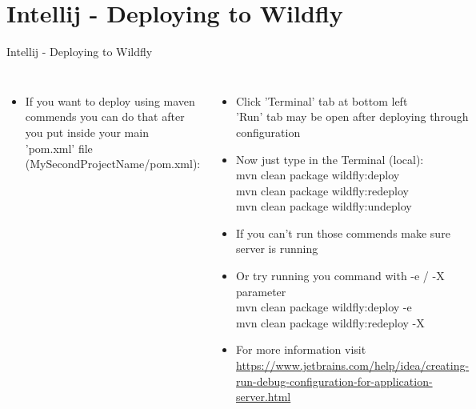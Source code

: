 \documentclass[aspectratio=1610,english]{beamer} %
\begin{document}
	\section{Intellij - Deploying to Wildfly}
	\begin{frame}{Intellij - Deploying to Wildfly}
		\begin{columns}
				\begin{itemize}
					\tiny
					\color{black}
					\item If you want to deploy using maven commends you can do that after you put inside your main 'pom.xml' file (MySecondProjectName/pom.xml): 
				\end{itemize}
				\begin{minipage}{\textwidth}
					\center{
					\fontsize{3}{4} \selectfont	
					\usebox\secondProjectPomBox 
					}
				\end{minipage}
				
				\begin{itemize}
					\tiny
					\color{black}
					\item Click 'Terminal' tab at bottom left \\
						\fontsize{3}{4} \selectfont
						\color{gray}
						'Run' tab may be open after deploying through configuration
					\tiny
					\color{black}
					\item Now just type in the Terminal (local): \\
					\fontsize{3}{4} \selectfont	
					\color{gray}
					mvn clean package wildfly:deploy \\
					mvn clean package wildfly:redeploy \\
					mvn clean package wildfly:undeploy 
					\tiny
					\color{red}
					\item If you can't run those commends make sure server is running
					\item Or try running you command with -e / -X parameter \\
					\fontsize{3}{4} \selectfont	
					\color{gray}
					mvn clean package wildfly:deploy -e \\
					mvn clean package wildfly:redeploy -X \\
					
					\tiny
					\color{black}
					\item For more information visit
					\fontsize{3}{4} \selectfont	
					\color{gray}
					\url{https://www.jetbrains.com/help/idea/creating-run-debug-configuration-for-application-server.html}
				\end{itemize}
		\end{columns}
	\end{frame}
\end{document}
